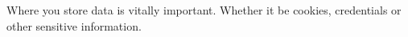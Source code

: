 Where you store data is vitally important. Whether it be cookies, credentials
or other sensitive information.

